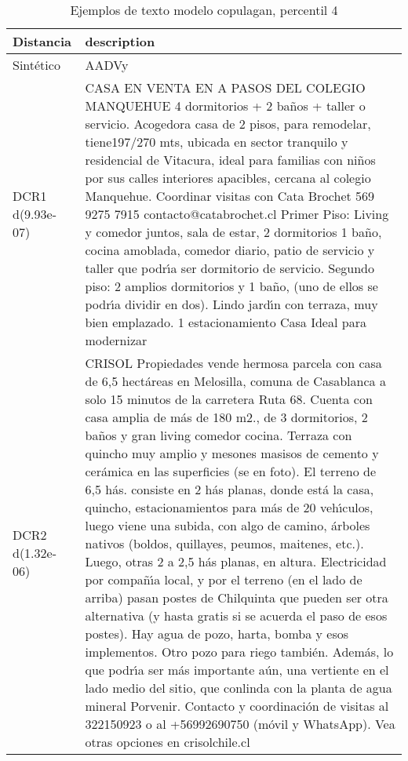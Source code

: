 \begin{table}[H]
\centering
\fontsize{10}{14}\selectfont
\caption{Ejemplos de texto modelo copulagan, percentil 4}
\label{table-example-economicos-a-3-copulagan-4p-text}
\begin{tabular}{|l|m{35em}|}
\hline
\rowcolor[gray]{0.8}
Distancia & description \\
\hline Sintético & AADVy \\
\hline DCR1 d(9.93e-07) & CASA EN VENTA EN A PASOS DEL COLEGIO MANQUEHUE 4 dormitorios + 2 ba\~nos + taller o servicio.   Acogedora casa de 2 pisos, para remodelar, tiene197/270 mts, ubicada en sector tranquilo y residencial de Vitacura, ideal para familias con ni\~nos por sus calles interiores apacibles, cercana al colegio Manquehue.  Coordinar visitas con Cata Brochet 569 9275 7915 contacto@catabrochet.cl  Primer Piso: Living y comedor juntos, sala de estar, 2 dormitorios 1 ba\~no, cocina amoblada, comedor diario, patio de servicio y taller que podr{\'\i}a ser dormitorio de servicio.  Segundo piso:  2 amplios dormitorios y 1 ba\~no, (uno de ellos se podr{\'\i}a dividir en dos).  Lindo jard{\'\i}n con terraza, muy bien emplazado.  1 estacionamiento Casa Ideal para modernizar \\
\hline DCR2 d(1.32e-06) & CRISOL Propiedades vende hermosa parcela con casa de 6,5 hect\'areas en Melosilla, comuna de Casablanca a solo 15 minutos de la carretera Ruta 68. Cuenta con casa amplia de m\'as de 180 m2., de 3 dormitorios, 2 ba\~nos y gran living comedor cocina. Terraza con quincho muy amplio y mesones masisos de cemento y cer\'amica en las superficies (se en foto). El terreno de 6,5 h\'as. consiste en 2 h\'as planas, donde est\'a la casa, quincho, estacionamientos para m\'as de 20 veh{\'\i}culos, luego viene una subida, con algo de camino, \'arboles nativos (boldos, quillayes, peumos, maitenes, etc.). Luego, otras 2 a 2,5 h\'as planas, en altura. Electricidad por compa\~n{\'\i}a local, y por el terreno (en el lado de arriba) pasan postes de Chilquinta que pueden ser otra alternativa (y hasta gratis si se acuerda el paso de esos postes). Hay agua de pozo, harta, bomba y esos implementos. Otro pozo para riego tambi\'en. Adem\'as, lo que podr{\'\i}a ser m\'as importante a\'un, una vertiente en el lado medio del sitio, que conlinda con la planta de agua mineral Porvenir. Contacto y coordinaci\'on de visitas al 322150923 o al +56992690750 (m\'ovil y WhatsApp). Vea otras opciones en crisolchile.cl \\
\hline
\end{tabular}
\end{table}
